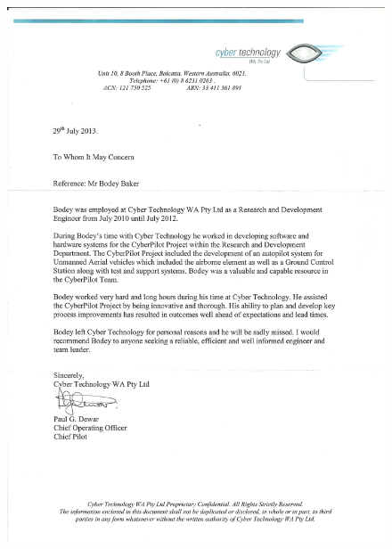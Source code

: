 \documentclass[10pt, a4paper]{report}
\begin{document}
%
\begin{figure}[h!]
   \centering
   \includegraphics[height=1.08\vsize]{images/ref-paul.jpg} 
\end{figure}
\end{document}
